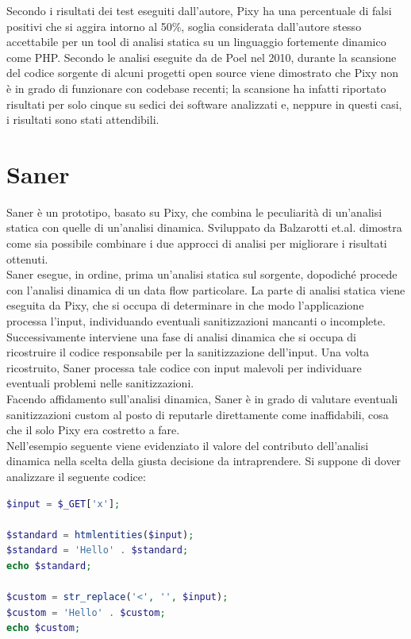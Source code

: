 Secondo i risultati dei test eseguiti dall'autore, Pixy ha una percentuale di falsi positivi che si aggira intorno al 50\%, soglia considerata dall'autore stesso accettabile per un tool di analisi statica su un linguaggio fortemente dinamico come PHP. Secondo le analisi eseguite da de Poel\cite{depoel} nel 2010, durante la scansione del codice sorgente di alcuni progetti open source viene dimostrato che Pixy non è in grado di funzionare con codebase recenti; la scansione ha infatti riportato risultati per solo cinque su sedici dei software analizzati e, neppure in questi casi, i risultati sono stati attendibili.
		
\section{Saner}
Saner è un prototipo, basato su Pixy, che combina le peculiarità di un'analisi statica con quelle di un'analisi dinamica. Sviluppato da Balzarotti et.al.\cite{saner} dimostra come sia possibile combinare i due approcci di analisi per migliorare i risultati ottenuti.\\
Saner esegue, in ordine, prima un'analisi statica sul sorgente, dopodiché procede con l'analisi dinamica di un data flow particolare. La parte di analisi statica viene eseguita da Pixy, che si occupa di determinare in che modo l'applicazione processa l'input, individuando eventuali sanitizzazioni mancanti o incomplete. Successivamente interviene una fase di analisi dinamica che si occupa di ricostruire il codice responsabile per la sanitizzazione dell'input. Una volta ricostruito, Saner processa tale codice con input malevoli per individuare eventuali problemi nelle sanitizzazioni.\\
Facendo affidamento sull'analisi dinamica, Saner è in grado di valutare eventuali sanitizzazioni custom al posto di reputarle direttamente come inaffidabili, cosa che il solo Pixy era costretto a fare.\\
Nell'esempio seguente viene evidenziato il valore del contributo dell'analisi dinamica nella scelta della giusta decisione da intraprendere.
Si suppone di dover analizzare il seguente codice:\\

\begin{lstlisting}[language=PHP]
$input = $_GET['x'];

$standard = htmlentities($input);
$standard = 'Hello' . $standard;
echo $standard;

$custom = str_replace('<', '', $input);
$custom = 'Hello' . $custom;
echo $custom;
\end{lstlisting}

